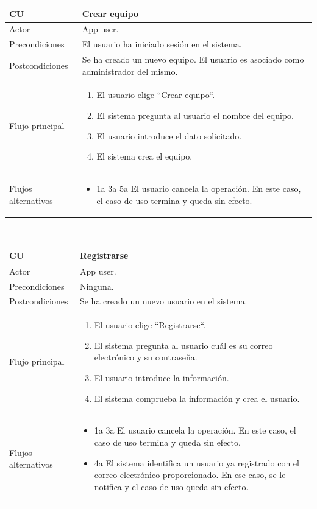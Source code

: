\documentclass[twoside]{report}
\newcommand\addrow[2]{#1 &#2\\ }
\newcommand\addheading[2]{#1 &#2\\ \hline}
\newcommand\tabularhead{\begin{tabular}{lp{0.7\textwidth}}
\hline
}
\newenvironment{usecase}{\tabularhead}
{\hline\end{tabular}}
\begin{document}
\begin{usecase}
  \addheading{\textbf{CU\arabic{usecase}}}{Crear equipo} 
  \addrow{Actor}{App user.}
  \addrow{Precondiciones}{El usuario ha iniciado sesión en el sistema.}
  \addrow{Postcondiciones}{Se ha creado un nuevo equipo. El usuario es asociado como administrador del mismo.}
  \addrow{Flujo principal}{
  		\begin{enumerate}
  		\item El usuario elige “Crear equipo“. %
  		\item El sistema pregunta al usuario el nombre del equipo. %
  		\item El usuario introduce el dato solicitado. %
  		\item El sistema  crea el equipo. %
  		\end{enumerate}
  }
  \addrow{Flujos alternativos}{
  		\begin{itemize}
  		\item 1a 3a 5a El usuario cancela la operación. En este caso, el caso de uso termina y queda sin efecto.
  		\end{itemize}
  }
\end{usecase}\\

\vspace{0.5cm}

\begin{usecase}
  \addheading{\textbf{CU\arabic{usecase}}}{Registrarse} 
  \addrow{Actor}{App user.}
  \addrow{Precondiciones}{Ninguna.}
  \addrow{Postcondiciones}{Se ha creado un nuevo usuario en el sistema.}
  \addrow{Flujo principal}{
  		\begin{enumerate}
  		\item El usuario elige “Registrarse“. %
  		\item El sistema pregunta al usuario cuál es su correo electrónico y su contraseña. %
  		\item El usuario introduce la información. %
  		\item El sistema comprueba la información y crea el usuario. %
  		\end{enumerate}
  }
  \addrow{Flujos alternativos}{
  		\begin{itemize}
  		\item 1a 3a El usuario cancela la operación. En este caso, el caso de uso termina y queda sin efecto.
  		\item 4a El sistema identifica un usuario ya registrado con el correo electrónico proporcionado. En ese caso, se le notifica y el caso de uso queda sin efecto.
  		\end{itemize}
  }
\end{usecase}\\
\end{document}
